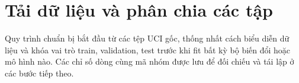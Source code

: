 \section{Tải dữ liệu và phân chia các tập}
\label{sec:4_2}
Quy trình chuẩn bị bắt đầu từ các tệp UCI gốc, thống nhất cách biểu diễn dữ liệu và khóa vai trò train, validation, test trước khi fit bất kỳ bộ biến đổi hoặc mô hình nào. Các chỉ số dòng cùng mã nhóm được lưu để đối chiếu và tái lập ở các bước tiếp theo.




